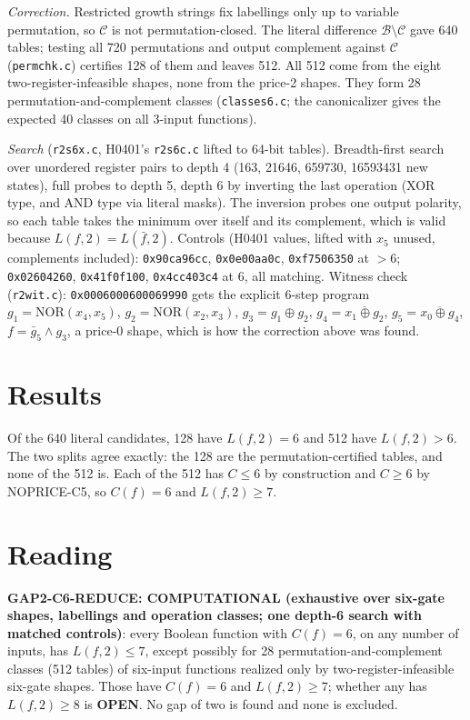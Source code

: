 \documentclass[11pt]{article}
\begin{document}
\emph{Correction.} Restricted growth strings fix labellings only up to variable permutation, so $\mathcal C$ is not permutation-closed. The literal difference $\mathcal B\setminus\mathcal C$ gave 640 tables; testing all 720 permutations and output complement against $\mathcal C$ (\texttt{permchk.c}) certifies 128 of them and leaves 512. All 512 come from the eight two-register-infeasible shapes, none from the price-2 shapes. They form 28 permutation-and-complement classes (\texttt{classes6.c}; the canonicalizer gives the expected 40 classes on all 3-input functions).

\emph{Search} (\texttt{r2s6x.c}, H0401's \texttt{r2s6c.c} lifted to 64-bit tables). Breadth-first search over unordered register pairs to depth 4 (163, 21646, 659730, 16593431 new states), full probes to depth 5, depth 6 by inverting the last operation (XOR type, and AND type via literal masks). The inversion probes one output polarity, so each table takes the minimum over itself and its complement, which is valid because $L(f,2)=L(\bar f,2)$. Controls (H0401 values, lifted with $x_5$ unused, complements included): \texttt{0x90ca96cc}, \texttt{0x0e00aa0c}, \texttt{0xf7506350} at $>6$; \texttt{0x02604260}, \texttt{0x41f0f100}, \texttt{0x4cc403c4} at $6$, all matching. Witness check (\texttt{r2wit.c}): \texttt{0x0006000600069990} gets the explicit 6-step program $g_1=\mathrm{NOR}(x_4,x_5)$, $g_2=\mathrm{NOR}(x_2,x_3)$, $g_3=g_1\oplus g_2$, $g_4=\overline{x_1\oplus g_2}$, $g_5=\overline{x_0\oplus g_4}$, $f=\bar g_5\wedge g_3$, a price-0 shape, which is how the correction above was found.

\section*{Results}
Of the 640 literal candidates, 128 have $L(f,2)=6$ and 512 have $L(f,2)>6$. The two splits agree exactly: the 128 are the permutation-certified tables, and none of the 512 is. Each of the 512 has $C\le6$ by construction and $C\ge6$ by NOPRICE-C5, so $C(f)=6$ and $L(f,2)\ge7$.

\section*{Reading}
\textbf{GAP2-C6-REDUCE: COMPUTATIONAL (exhaustive over six-gate shapes, labellings and operation classes; one depth-6 search with matched controls)}: every Boolean function with $C(f)=6$, on any number of inputs, has $L(f,2)\le7$, except possibly for 28 permutation-and-complement classes (512 tables) of six-input functions realized only by two-register-infeasible six-gate shapes. Those have $C(f)=6$ and $L(f,2)\ge7$; whether any has $L(f,2)\ge8$ is \textbf{OPEN}. No gap of two is found and none is excluded.
\end{document}
